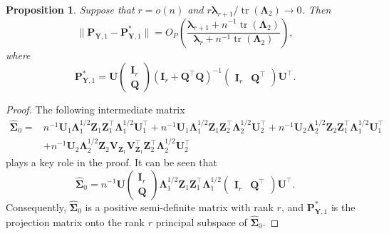 \documentclass[12pt]{article} %
\DeclareMathOperator{\mytr}{tr}
\newcommand{\bQ}{\mathbf{Q}}
\newcommand{\bZ}{\mathbf{Z}}
\newcommand{\bP}{\mathbf{P}}
\newcommand{\bY}{\mathbf{Y}}
\newcommand{\bI}{\mathbf{I}}
\newcommand{\bU}{\mathbf{U}}
\newcommand{\bV}{\mathbf{V}}
\newcommand{\bfsym}[1]{\ensuremath{\boldsymbol{#1}}}
\def\blambda {\bfsym {\lambda}}
\def\bLambda {\bfsym {\Lambda}}
\def\bSigma {\bfsym {\Sigma}}
\newtheorem{proposition}{Proposition}
\theoremstyle{definition}
\begin{document}
\begin{appendices}
\begin{proposition}\label{newEigenvectorProp}
    Suppose that $r=o(n)$ and $r\blambda_{r+1} /\mytr(\bLambda_2)\to 0$. Then
    \begin{equation*}
        \|\bP_{\bY,1} -\bP_{\bY,1}^* \|
        =O_P\left(\frac{\blambda_{r+1}+n^{-1}\mytr(\bLambda_2)}{\blambda_r +n^{-1}\mytr(\bLambda_2)}\right),
    \end{equation*}
    where
    \begin{equation*}
        \bP_{\bY,1}^*=
    \bU
    \begin{pmatrix}
       \bI_r \\
       \bQ
    \end{pmatrix}
    \left(\bI_r+ \bQ^\top \bQ \right)^{-1}
    \begin{pmatrix}
        \bI_r
          &
          \bQ^\top
        \end{pmatrix}
        \bU^\top.
    \end{equation*}
\end{proposition}
\begin{proof}
    The following intermediate matrix
    \begin{equation*}
        \begin{split}
    \hat{\bSigma}_0 =&
    n^{-1}\bU_1 \bLambda_1^{1/2} \bZ_1 \bZ_1^\top \bLambda_1^{1/2}\bU_1^\top
    +n^{-1}\bU_1 \bLambda_1^{1/2} \bZ_1 \bZ_2^\top \bLambda_2^{1/2}\bU_2^\top
    +n^{-1}\bU_2 \bLambda_2^{1/2} \bZ_2 \bZ_1^\top \bLambda_1^{1/2}\bU_1^\top
    \\
    &+n^{-1}\bU_2 \bLambda_2^{1/2} \bZ_2 \bV_{\bZ_1}\bV_{\bZ_1}^\top
    \bZ_2^\top \bLambda_2^{1/2}\bU_2^\top
        \end{split}
    \end{equation*}
    plays a key role in the proof.
    It can be seen that 
    \begin{equation*}
        \hat{\bSigma}_0=n^{-1}
    \bU
    \begin{pmatrix}
       \bI_r \\
       \bQ
    \end{pmatrix}
    \bLambda_1^{1/2}\bZ_1 \bZ_1^\top\bLambda_1^{1/2}
    \begin{pmatrix}
        \bI_r
          &
          \bQ^\top
        \end{pmatrix}
        \bU^\top.
    \end{equation*}
    Consequently, $\hat{\bSigma}_0$ is a positive semi-definite matrix with rank $r$, and $\bP_{\bY,1}^*$ is the projection matrix onto the rank $r$ principal subspace of $\hat{\bSigma}_0$.


\end{proof}
\end{appendices}
\end{document}

